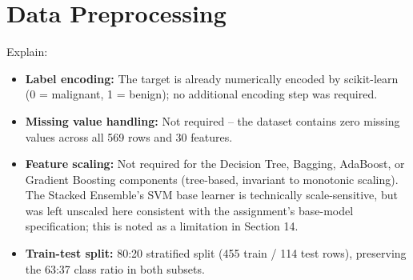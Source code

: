 \documentclass[12pt,a4paper]{article}
\begin{document}
\section{Data Preprocessing}
Explain:
\begin{itemize}
\item \textbf{Label encoding:} The target is already numerically encoded by scikit-learn
(0 = malignant, 1 = benign); no additional encoding step was required.
\item \textbf{Missing value handling:} Not required -- the dataset contains zero missing
values across all 569 rows and 30 features.
\item \textbf{Feature scaling:} Not required for the Decision Tree, Bagging, AdaBoost, or
Gradient Boosting components (tree-based, invariant to monotonic scaling). The Stacked
Ensemble's SVM base learner is technically scale-sensitive, but was left unscaled here
consistent with the assignment's base-model specification; this is noted as a limitation in
Section 14.
\item \textbf{Train-test split:} 80:20 stratified split (455 train / 114 test rows),
preserving the 63:37 class ratio in both subsets.
\end{itemize}
\end{document}

